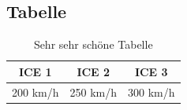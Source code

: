 \subsection{Tabelle}

\begin{table}[h]
\begin{center}
\begin{tabular}[h]{c|c|c}
ICE 1 & ICE 2 & ICE 3 \\ \hline
200 km/h & 250 km/h  & 300 km/h  \\
\end{tabular}
\caption{Sehr sehr schöne Tabelle}
\end{center}
\end{table}